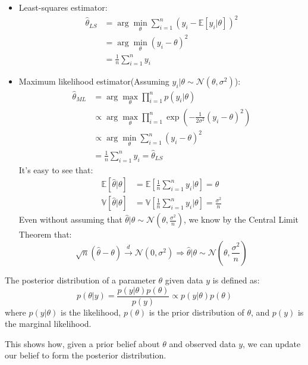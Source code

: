 \begin{itemize}
    \item Least-squares estimator:
    \begin{align}
        \hat{\theta}_{LS} &= \arg \min_\theta \sum_{i=1}^n (y_i - \mathbb{E}[ y_i | \theta ])^2 \\
        &= \arg \min_\theta \left( y_i - \theta \right)^2 \\
        &= \frac{1}{n} \sum_{i=1}^n y_i
    \end{align}
    \item Maximum likelihood estimator(Assuming $y_i | \theta \sim \mathcal{N} \left( \theta , \sigma^2 \right)$):
    \begin{align}
        \hat{\theta}_{ML} &= \arg \max_\theta \prod_{i=1}^n p(y_i | \theta) \\
        &\propto \arg \max_\theta \prod_{i=1}^n \exp \left( -\frac{1}{2\sigma^2} (y_i - \theta)^2 \right) \\
        &\propto \arg \min_\theta \sum_{i=1}^n (y_i - \theta)^2 \\
        &= \frac{1}{n} \sum_{i=1}^n y_i = \hat{\theta}_{LS}
    \end{align}
    It's easy to see that:
    \begin{align}
        \mathbb{E}[\hat{\theta } | \theta ] &= \mathbb{E} \left[ \frac{1}{n} \sum_{i=1}^n y_i | \theta \right] = \theta \\
        \mathbb{V}[\hat{\theta } | \theta ] &= \mathbb{V} \left[ \frac{1}{n} \sum_{i=1}^n y_i | \theta \right] = \frac{\sigma^2}{n}
    \end{align}
    Even without assuming that $\hat{\theta } | \theta \sim \mathcal{N} \left( \theta , \frac{\sigma^2}{n} \right)$,
    we know by the Central Limit Theorem that:
    \begin{equation}
        \sqrt{n} \left( \hat{\theta } - \theta \right) \xrightarrow{d} \mathcal{N} \left( 0 , \sigma^2 \right) \Rightarrow \hat{\theta } | \theta \sim \mathcal{N} \left( \theta , \frac{\sigma^2}{n} \right)
    \end{equation}
\end{itemize}

\begin{definition}[Posterior]
    The posterior distribution of a parameter $\theta$ given data $y$ is defined as:
    \begin{equation}
        p(\theta | y) = \frac{p(y | \theta) p(\theta)}{p(y)} \propto p(y | \theta) p(\theta)
    \end{equation}
    where $p(y | \theta)$ is the likelihood, $p(\theta)$ is the prior distribution of $\theta$, and $p(y)$ is the marginal likelihood.

    This shows how, given a prior belief about $\theta$ and observed data $y$,
    we can update our belief to form the posterior distribution.
\end{definition}

